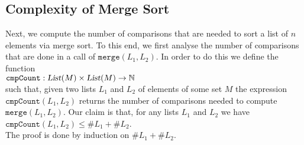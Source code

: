 \subsection{Complexity of Merge Sort}
Next, we compute the number of comparisons that are needed to sort a list of $n$
elements via merge sort.  To this end, we first analyse the number of comparisons that 
are done in a call of $\mathtt{merge}(L_1, L_2)$.   In order to do this we define the function \\[0.2cm]
\hspace*{1.3cm} 
$\mathtt{cmpCount}: \textsl{List}(M) \times \textsl{List}(M) \rightarrow \mathbb{N}$ 
\\[0.2cm]
such that, given two lists $L_1$ and $L_2$ of elements of some set $M$ the expression $\mathtt{cmpCount}(L_1, L_2)$ returns the
number of comparisons needed to compute $\texttt{merge}(L_1,L_2)$. 
Our claim is that, for any lists $L_1$ and $L_2$ we have  
\\[0.2cm]
\hspace*{1.3cm}
$\mathtt{cmpCount}(L_1, L_2) \leq \# L_1 + \# L_2$. 
\\[0.2cm]
The proof is done by induction on $\#L_1 + \#L_2$.
